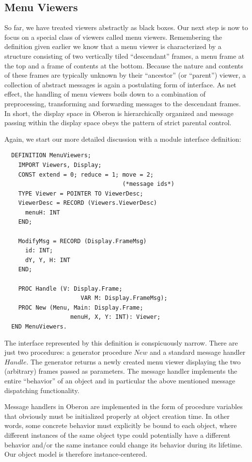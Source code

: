 \subsection{Menu Viewers}
So far, we have treated viewers abstractly as black boxes. Our next step is now to focus on a
special class of viewers called menu viewers. Remembering the definition given earlier we know
that a menu viewer is characterized by a structure consisting of two vertically tiled “descendant”
frames, a menu frame at the top and a frame of contents at the bottom. Because the nature and
contents of these frames are typically unknown by their “ancestor” (or “parent”) viewer, a collection
of abstract messages is again a postulating form of interface. As net effect, the handling of menu
viewers boils down to a combination of preprocessing, transforming and forwarding messages to
the descendant frames. In short, the display space in Oberon is hierarchically organized and
message passing within the display space obeys the pattern of strict parental control.

Again, we start our more detailed discussion with a module interface definition:
\begin{verbatim}
  DEFINITION MenuViewers;
    IMPORT Viewers, Display;
    CONST extend = 0; reduce = 1; move = 2;
                                  (*message ids*)
    TYPE Viewer = POINTER TO ViewerDesc;
    ViewerDesc = RECORD (Viewers.ViewerDesc)
      menuH: INT
    END;

    ModifyMsg = RECORD (Display.FrameMsg)
      id: INT;
      dY, Y, H: INT
    END;

    PROC Handle (V: Display.Frame;
                      VAR M: Display.FrameMsg);
    PROC New (Menu, Main: Display.Frame;
                   menuH, X, Y: INT): Viewer;
  END MenuViewers.
\end{verbatim}
The interface represented by this definition is conspicuously narrow. There are just two
procedures: a generator procedure $New$ and a standard message handler $Handle$. The generator
returns a newly created menu viewer displaying the two (arbitrary) frames passed as parameters.
The message handler implements the entire “behavior” of an object and in particular the above
mentioned message dispatching functionality.

Message handlers in Oberon are implemented in the form of procedure variables that obviously
must be initialized properly at object creation time. In other words, some concrete behavior must
explicitly be bound to each object, where different instances of the same object type could
potentially have a different behavior and/or the same instance could change its behavior during its
lifetime. Our object model is therefore instance-centered.

